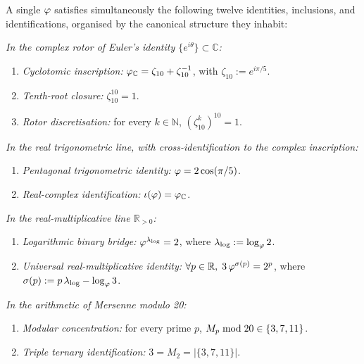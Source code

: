 \begin{Theorem}\label{thm:coincidence-intro}
A single $\varphi$ satisfies simultaneously the following twelve
identities, inclusions, and identifications, organised by the
canonical structure they inhabit:

\smallskip
\noindent\emph{In the complex rotor of Euler's identity
$\{e^{i\theta}\}\subset\mathbb{C}$:}
\begin{enumerate}[topsep=0.2em,itemsep=0.1em,leftmargin=2.3em]
  \item[\textup{(i)}] \emph{Cyclotomic inscription:}
    $\varphi_\mathbb{C} = \zeta_{10}+\zeta_{10}^{-1}$, with
    $\zeta_{10}:=e^{i\pi/5}$.
  \item[\textup{(ii)}] \emph{Tenth-root closure:} $\zeta_{10}^{10}=1$.
  \item[\textup{(xii)}] \emph{Rotor discretisation:} for every
    $k\in\mathbb{N}$, $(\zeta_{10}^{k})^{10}=1$.
\end{enumerate}

\smallskip
\noindent\emph{In the real trigonometric line, with cross-identification
to the complex inscription:}
\begin{enumerate}[topsep=0.2em,itemsep=0.1em,leftmargin=2.3em]
  \item[\textup{(iii)}] \emph{Pentagonal trigonometric identity:}
    $\varphi = 2\cos(\pi/5)$.
  \item[\textup{(viii)}] \emph{Real-complex identification:}
    $\iota(\varphi) = \varphi_\mathbb{C}$.
\end{enumerate}

\smallskip
\noindent\emph{In the real-multiplicative line $\mathbb{R}_{>0}$:}
\begin{enumerate}[topsep=0.2em,itemsep=0.1em,leftmargin=2.3em]
  \item[\textup{(iv)}] \emph{Logarithmic binary bridge:}
    $\varphi^{\lambda_{\log}}=2$, where
    $\lambda_{\log}:=\log_{\varphi}2$.
  \item[\textup{(v)}] \emph{Universal real-multiplicative identity:}
    $\forall p\in\mathbb{R},\;3\,\varphi^{\sigma(p)}=2^{p}$, where
    $\sigma(p):=p\,\lambda_{\log}-\log_{\varphi}3$.
\end{enumerate}

\smallskip
\noindent\emph{In the arithmetic of Mersenne modulo 20:}
\begin{enumerate}[topsep=0.2em,itemsep=0.1em,leftmargin=2.3em]
  \item[\textup{(vi)}] \emph{Modular concentration:} for every prime
    $p$, $M_{p}\bmod 20\in\{3,7,11\}$.
  \item[\textup{(vii)}] \emph{Triple ternary identification:}
    $3 = M_{2} = |\{3,7,11\}|$.
\end{enumerate}


\end{Theorem}
